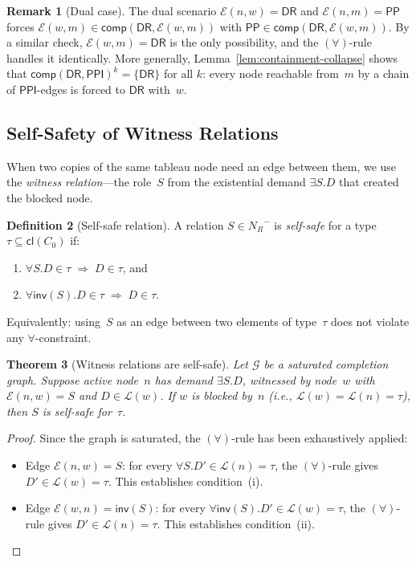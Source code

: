 \documentclass[a4paper,11pt]{article}
\newtheorem{theorem}{Theorem}[section]
\theoremstyle{definition}
\newtheorem{definition}[theorem]{Definition}
\newtheorem{remark}[theorem]{Remark}
\newcommand{\NR}{\ensuremath{N_R}}
\newcommand{\DR}{\ensuremath{\mathsf{DR}}}
\newcommand{\PP}{\ensuremath{\mathsf{PP}}}
\newcommand{\PPI}{\ensuremath{\mathsf{PPI}}}
\newcommand{\inv}{\ensuremath{\mathsf{inv}}}
\newcommand{\comp}{\ensuremath{\mathsf{comp}}}
\newcommand{\cl}{\ensuremath{\mathsf{cl}}}
\begin{document}
\begin{remark}[Dual case]
\label{rem:dual}
The dual scenario $\mathcal{E}(n, w) = \DR$ and $\mathcal{E}(n, m)
= \PP$ forces $\mathcal{E}(w, m) \in \comp(\DR, \mathcal{E}(w, m))$
with $\PP \in \comp(\DR, \mathcal{E}(w, m))$.  By a similar check,
$\mathcal{E}(w, m) = \DR$ is the only possibility, and the
$(\forall)$-rule handles it identically.  More generally,
Lemma~\ref{lem:containment-collapse} shows that $\comp(\DR,
\PPI)^k = \{\DR\}$ for all $k$: every node reachable from~$m$ by a
chain of $\PPI$-edges is forced to $\DR$ with~$w$.
\end{remark}

\subsection{Self-Safety of Witness Relations}

When two copies of the same tableau node need an edge between them, we
use the \emph{witness relation}---the role~$S$ from the existential
demand $\exists S.D$ that created the blocked node.

\begin{definition}[Self-safe relation]
\label{def:self-safe}
A relation $S \in \NR^{-}$ is \emph{self-safe} for a type $\tau
\subseteq \cl(C_0)$ if:
\begin{enumerate}[nosep,label=(\roman*)]
  \item $\forall S.D \in \tau \;\Rightarrow\; D \in \tau$, and
  \item $\forall \inv(S).D \in \tau \;\Rightarrow\; D \in \tau$.
\end{enumerate}
Equivalently: using~$S$ as an edge between two elements of type~$\tau$
does not violate any $\forall$-constraint.
\end{definition}

\begin{theorem}[Witness relations are self-safe]
\label{thm:self-safe}
Let $\mathcal{G}$ be a saturated completion graph.  Suppose active
node~$n$ has demand $\exists S.D$, witnessed by node~$w$ with
$\mathcal{E}(n, w) = S$ and $D \in \mathcal{L}(w)$.  If $w$ is
blocked by~$n$ \textup{(}i.e., $\mathcal{L}(w) = \mathcal{L}(n) =
\tau$\textup{)}, then $S$ is self-safe for~$\tau$.
\end{theorem}

\begin{proof}
Since the graph is saturated, the $(\forall)$-rule has been
exhaustively applied:
\begin{itemize}[nosep]
  \item Edge $\mathcal{E}(n, w) = S$: for every $\forall S.D' \in
    \mathcal{L}(n) = \tau$, the $(\forall)$-rule gives $D' \in
    \mathcal{L}(w) = \tau$.  This establishes condition~(i).
  \item Edge $\mathcal{E}(w, n) = \inv(S)$: for every $\forall
    \inv(S).D' \in \mathcal{L}(w) = \tau$, the $(\forall)$-rule
    gives $D' \in \mathcal{L}(n) = \tau$.  This establishes
    condition~(ii). \qedhere
\end{itemize}
\end{proof}
\end{document}
